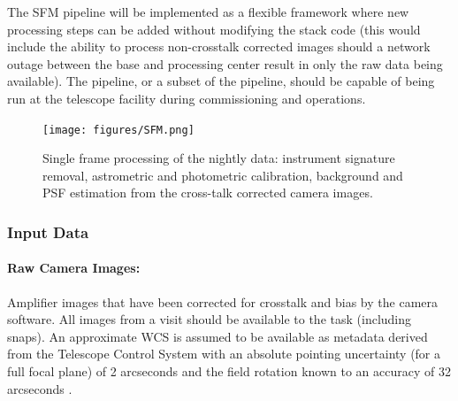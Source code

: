 The SFM pipeline will be implemented as a flexible framework where new processing steps can be added without modifying the stack code (this would include the ability to process non-crosstalk corrected images should a network outage between the base and processing center result in  only the raw data being available). The pipeline, or a subset of the pipeline, should be capable of being run at the telescope facility during commissioning and operations.

\begin{figure}[th]
\begin{center}
\texttt{[image: figures/SFM.png]}
\caption{\label{fig:apSFM} Single frame processing of the nightly data: instrument signature removal, astrometric and photometric calibration, background and PSF estimation from the cross-talk corrected camera images.}
\end{center}
\end{figure}


\subsubsection{Input Data}
\label{sec:apSFMinput}

\paragraph*{Raw Camera Images:} Amplifier images that have been corrected for crosstalk and bias by the camera software. All images from a visit should be available to the task (including snaps). An approximate WCS is assumed to be available as metadata derived from the Telescope Control System with an absolute pointing uncertainty (for a full focal plane) of 2 arcseconds  and the field rotation known to an accuracy of 32 arcseconds .

